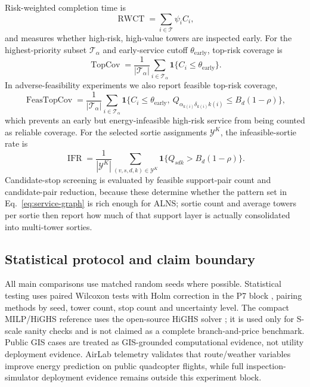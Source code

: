 Risk-weighted completion time is
\begin{equation}
\operatorname{RWCT}=\sum_{i\in\mathcal{T}}\psi_i C_i,
\label{eq:metric-rwct}
\end{equation}
and measures whether high-risk, high-value towers are inspected early. For the highest-priority subset $\mathcal{T}_\alpha$ and early-service cutoff $\theta_\mathrm{early}$, top-risk coverage is
\begin{equation}
\operatorname{TopCov}=\frac{1}{|\mathcal{T}_\alpha|}\sum_{i\in\mathcal{T}_\alpha}\mathbf{1}\{C_i\leq \theta_\mathrm{early}\}.
\label{eq:metric-topcov}
\end{equation}
In adverse-feasibility experiments we also report feasible top-risk coverage,
\begin{equation}
\operatorname{FeasTopCov}=\frac{1}{|\mathcal{T}_\alpha|}\sum_{i\in\mathcal{T}_\alpha}\mathbf{1}\{C_i\leq \theta_\mathrm{early},\ Q_{\alpha_{k(i)}\delta_{k(i)}k(i)}\leq B_d(1-\rho)\},
\label{eq:metric-feasible-topcov}
\end{equation}
which prevents an early but energy-infeasible high-risk service from being counted as reliable coverage.
For the selected sortie assignments $\mathcal{Y}^{K}$, the infeasible-sortie rate is
\begin{equation}
\operatorname{IFR}=\frac{1}{|\mathcal{Y}^{K}|}\sum_{(v,s,d,k)\in\mathcal{Y}^{K}}\mathbf{1}\{Q_{sdk}>B_d(1-\rho)\}.
\label{eq:metric-ifr}
\end{equation}
Candidate-stop screening is evaluated by feasible support-pair count and candidate-pair reduction, because these determine whether the pattern set in Eq.~\eqref{eq:service-graph} is rich enough for ALNS; sortie count and average towers per sortie then report how much of that support layer is actually consolidated into multi-tower sorties.

\subsection{Statistical protocol and claim boundary}

All main comparisons use matched random seeds where possible. Statistical testing uses paired Wilcoxon tests with Holm correction in the P7 block \citep{wilcoxon1945individual,holm1979simple}, pairing methods by seed, tower count, stop count and uncertainty level. The compact MILP/HiGHS reference uses the open-source HiGHS solver \citep{huangfu2018parallelizing}; it is used only for S-scale sanity checks and is not claimed as a complete branch-and-price benchmark. Public GIS cases are treated as GIS-grounded computational evidence, not utility deployment evidence. AirLab telemetry validates that route/weather variables improve energy prediction on public quadcopter flights, while full inspection-simulator deployment evidence remains outside this experiment block.

